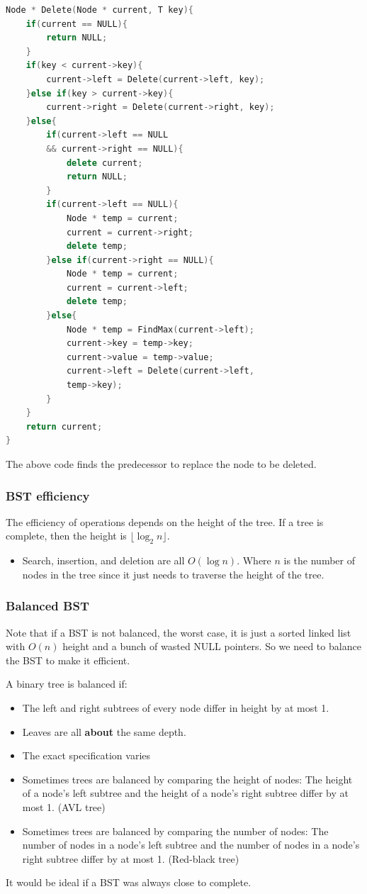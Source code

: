 \documentclass[letterpaper,12pt]{article}
\begin{document}
\begin{lstlisting}[language=C++]
Node * Delete(Node * current, T key){
    if(current == NULL){
        return NULL;
    }
    if(key < current->key){
        current->left = Delete(current->left, key);
    }else if(key > current->key){
        current->right = Delete(current->right, key);
    }else{
        if(current->left == NULL 
        && current->right == NULL){
            delete current;
            return NULL;
        }
        if(current->left == NULL){
            Node * temp = current;
            current = current->right;
            delete temp;
        }else if(current->right == NULL){
            Node * temp = current;
            current = current->left;
            delete temp;
        }else{
            Node * temp = FindMax(current->left);
            current->key = temp->key;
            current->value = temp->value;
            current->left = Delete(current->left, 
            temp->key);
        }
    }
    return current;
}
\end{lstlisting}
The above code finds the predecessor to replace the node to be deleted. 
\subsubsection{BST efficiency}
The efficiency of operations depends on the height of the tree. If a tree is complete, then the height is $\lfloor \log_2 n \rfloor$.\begin{itemize}
    \item Search, insertion, and deletion are all $O(\log n)$. Where $n$ is the number of nodes in the tree since it just needs to traverse the height of the tree.
\end{itemize}
\subsubsection{Balanced BST}
Note that if a BST is not balanced, the worst case, it is just a sorted linked list with $O(n)$ height and a bunch of wasted NULL pointers. So we need to balance the BST to make it efficient.

A binary tree is balanced if:\begin{itemize}
    \item The left and right subtrees of every node differ in height by at most 1.
    \item Leaves are all \textbf{about} the same depth.
    \item The exact specification varies
    \item Sometimes trees are balanced by comparing the height of nodes: The height of a node's left subtree and the height of a node's right subtree differ by at most 1. (AVL tree)
    \item Sometimes trees are balanced by comparing the number of nodes: The number of nodes in a node's left subtree and the number of nodes in a node's right subtree differ by at most 1. (Red-black tree)
\end{itemize}
It would be ideal if a BST was always close to complete. 
\end{document}
